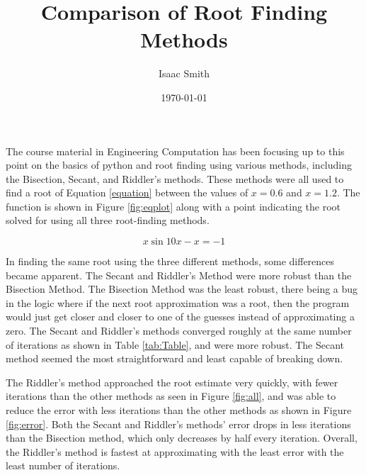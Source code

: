 \documentclass[11pt]{article}
\title{Comparison of Root Finding Methods}
\author{Isaac Smith} %
\date{\today} %
\begin{document}
\maketitle
  

\setlength{\baselineskip}{22pt}
%

The course material in Engineering Computation has been focusing up to this point on the basics of python and root finding using various methods, including the Bisection, Secant, and Riddler's methods. These methods were all used to find a root of Equation \ref{equation} between the values of $x=0.6$ and $x=1.2$. The function is shown in Figure \ref{fig:eqplot} along with a point indicating the root solved for using all three root-finding methods.

\begin{equation}
    x \sin 10x - x = -1
    \label{equation}
\end{equation}

In finding the same root using the three different methods, some differences became apparent. The Secant and Riddler's Method were more robust than the Bisection Method. The Bisection Method was the least robust, there being a bug in the logic where if the next root approximation was a root, then the program would just get closer and closer to one of the guesses instead of approximating a zero. The Secant and Riddler's methods converged roughly at the same number of iterations as shown in Table \ref{tab:Table}, and were more robust. The Secant method seemed the most straightforward and least capable of breaking down.

The Riddler's method approached the root estimate very quickly, with fewer iterations than the other methods as seen in Figure \ref{fig:all}, and was able to reduce the error with less iterations than the other methods as shown in Figure \ref{fig:error}. Both the Secant and Riddler's methods' error drops in less iterations than the Bisection method, which only decreases by half every iteration. Overall, the Riddler's method is fastest at approximating with the least error with the least number of iterations. 
\end{document}

